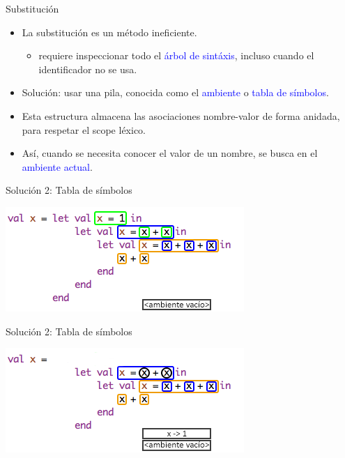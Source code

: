 \documentclass{beamer} %
\newcommand{\blue}[1]{\textcolor{blue}{#1}}
\begin{document}
\begin{frame}{Substitución}
    \begin{itemize}
        \item<1-> La substitución es un método ineficiente.
        \begin{itemize}
            \item requiere inspeccionar todo el \blue{árbol de sintáxis}, incluso cuando el identificador no se usa.
        \end{itemize}
        \item<2-> Solución: usar una pila, conocida como el \blue{ambiente} o \blue{tabla de símbolos}.
        \item<2-> Esta estructura almacena las asociaciones nombre-valor de forma anidada, para respetar el scope léxico.
        \item<3-> Así, cuando se necesita conocer el valor de un nombre, se busca en el \blue{ambiente actual}.
    \end{itemize}
\end{frame}

\begin{frame}{Solución 2: Tabla de símbolos}
    \begin{center}
        \includegraphics[width=.9\textwidth]{./image/cap5/scope-b02}
    \end{center}
\end{frame}

\begin{frame}{Solución 2: Tabla de símbolos}
    \begin{center}
        \includegraphics[width=.9\textwidth]{./image/cap5/scope-b03}
    \end{center}
\end{frame}
\end{document}
